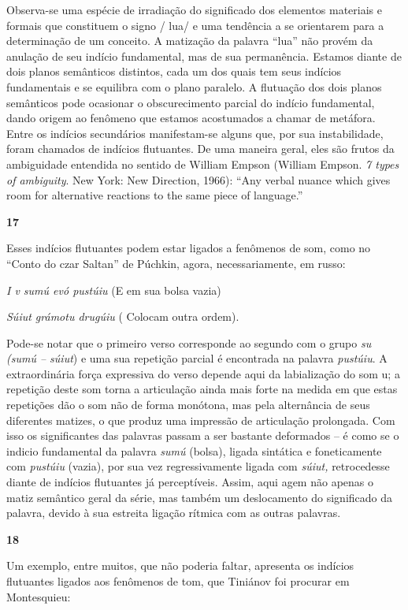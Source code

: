Observa-se uma espécie de irradiação do significado dos elementos
materiais e formais que constituem o signo / lua/ e uma tendência a se
orientarem para a determinação de um conceito. A matização da palavra
``lua'' não provém da anulação de seu indício fundamental, mas de sua
permanência. Estamos diante de dois planos semânticos distintos, cada um
dos quais tem seus indícios fundamentais e se equilibra com o plano
paralelo. A flutuação dos dois planos semânticos pode ocasionar o
obscurecimento parcial do indício fundamental, dando origem ao fenômeno
que estamos acostumados a chamar de metáfora. Entre os indícios
secundários manifestam-se alguns que, por sua instabilidade, foram
chamados de indícios flutuantes. De uma maneira geral, eles são frutos
da ambiguidade entendida no sentido de William Empson (William Empson.
\emph{7 types of ambiguity}. New York: New Direction, 1966): ``Any
verbal nuance which gives room for alternative reactions to the same
piece of language.''

\textbf{17}

Esses indícios flutuantes podem estar ligados a fenômenos de som, como
no ``Conto do czar Saltan'' de Púchkin, agora, necessariamente, em
russo:

\emph{I v sumú evó pustúiu} (E em sua bolsa vazia)

\emph{Súiut grámotu drugúiu} ( Colocam outra ordem).

Pode-se notar que o primeiro verso corresponde ao segundo com o grupo
\emph{su (sumú -- súiut}) e uma sua repetição parcial é encontrada na
palavra \emph{pustúiu}. A extraordinária força expressiva do verso
depende aqui da labialização do som {u}; a repetição deste som torna a
articulação ainda mais forte na medida em que estas repetições dão o som
não de forma monótona, mas pela alternância de seus diferentes matizes,
o que produz uma impressão de articulação prolongada. Com isso os
significantes das palavras passam a ser bastante deformados -- é como se
o indicio fundamental da palavra \emph{sumú} (bolsa), ligada sintática e
foneticamente com \emph{pustúiu} (vazia), por sua vez regressivamente
ligada com \emph{súiut,} retrocedesse diante de indícios flutuantes já
perceptíveis. Assim, aqui agem não apenas o matiz semântico geral da
série, mas também um deslocamento do significado da palavra, devido à
sua estreita ligação rítmica com as outras palavras.

\textbf{18}

Um exemplo, entre muitos, que não poderia faltar, apresenta os indícios
flutuantes ligados aos fenômenos de tom, que Tiniánov foi procurar em
Montesquieu:

